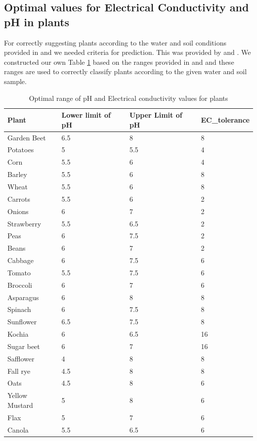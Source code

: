 \subsection{Optimal values for Electrical Conductivity and pH in plants}
\label{subsection:valueRangesEC&pH}
For correctly suggesting plants according to the water and soil conditions provided in \cite{dataset:majorIons} and \cite{dataset:lucas} we needed criteria for prediction. This was provided by \cite{article:saltTolerance} and \cite{article:phValues}. We constructed our own Table \ref{table:phAndECRanges} based on the ranges provided in \cite{article:saltTolerance} and \cite{article:phValues} and these ranges are used to correctly classify plants according to the given water and soil sample.

\begin{table}[H]
    \centering
    \begin{tabular}{|l|l|l|l|}
    \hline
        \textbf{Plant} & \textbf{Lower limit of pH} & \textbf{Upper Limit of pH} & \textbf{EC\_tolerance} \\ \hline
        Garden Beet & 6.5 & 8 & 8 \\ \hline
        Potatoes & 5 & 5.5 & 4 \\ \hline
        Corn & 5.5 & 6 & 4 \\ \hline
        Barley & 5.5 & 6 & 8 \\ \hline
        Wheat & 5.5 & 6 & 8 \\ \hline
        Carrots & 5.5 & 6 & 2 \\ \hline
        Onions & 6 & 7 & 2 \\ \hline
        Strawberry & 5.5 & 6.5 & 2 \\ \hline
        Peas & 6 & 7.5 & 2 \\ \hline
        Beans & 6 & 7 & 2 \\ \hline
        Cabbage & 6 & 7.5 & 6 \\ \hline
        Tomato & 5.5 & 7.5 & 6 \\ \hline
        Broccoli & 6 & 7 & 6 \\ \hline
        Asparagus & 6 & 8 & 8 \\ \hline
        Spinach & 6 & 7.5 & 8 \\ \hline
        Sunflower & 6.5 & 7.5 & 8 \\ \hline
        Kochia & 6 & 6.5 & 16 \\ \hline
        Sugar beet & 6 & 7 & 16 \\ \hline
        Safflower & 4 & 8 & 8 \\ \hline
        Fall rye & 4.5 & 8 & 8 \\ \hline
        Oats & 4.5 & 8 & 6 \\ \hline
        Yellow Mustard & 5 & 8 & 6 \\ \hline
        Flax & 5 & 7 & 6 \\ \hline
        Canola & 5.5 & 6.5 & 6 \\ \hline
    \end{tabular}
    \caption{Optimal range of pH and Electrical conductivity values for plants}
    \label{table:phAndECRanges}
\end{table}

